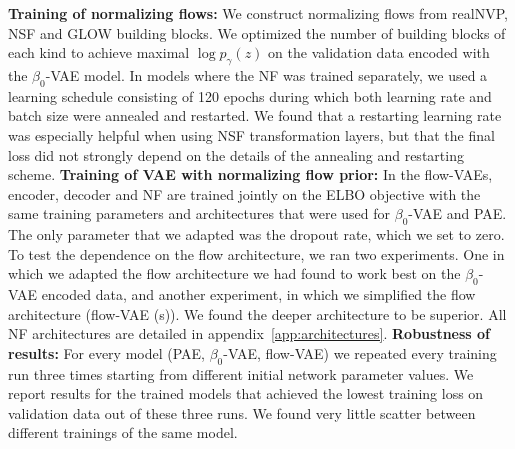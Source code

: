 \documentclass[10pt]{article} \usepackage[accepted]{tmlr}
\begin{document}
\newline
\textbf{Training of normalizing flows:}
We construct normalizing flows from realNVP, NSF and GLOW building blocks. We optimized the number of building blocks of each kind to achieve maximal $\log p_\gamma(z)$ on the validation data encoded with the $\beta_0$-VAE model. In models where the NF was trained separately, we used a learning schedule consisting of 120 epochs during which both learning rate and batch size were annealed and restarted. We found that a restarting learning rate was especially helpful when using NSF transformation layers, but that the final loss did not strongly depend on the details of the annealing and restarting scheme. 
\newline
\textbf{Training of VAE with normalizing flow prior:}
In the flow-VAEs, encoder, decoder and NF are trained jointly on the ELBO objective with the same training parameters and architectures that were used for $\beta_0$-VAE and PAE. The only parameter that we adapted was the dropout rate, which we set to zero. To test the dependence on the flow architecture, we ran two experiments. One in which we adapted the flow architecture we had found to work best on the $\beta_0$-VAE encoded data, and another experiment, in which we simplified the flow architecture (flow-VAE (s)). We found the deeper architecture to be superior. All NF architectures are detailed in appendix~\ref{app:architectures}.
\newline
\textbf{Robustness of results:}
For every model (PAE, $\beta_0$-VAE, flow-VAE) we repeated every training run three times starting from different initial network parameter values. We report results for the trained models that achieved the lowest training loss on validation data out of these three runs. We found very little scatter between different trainings of the same model.
\end{document}
